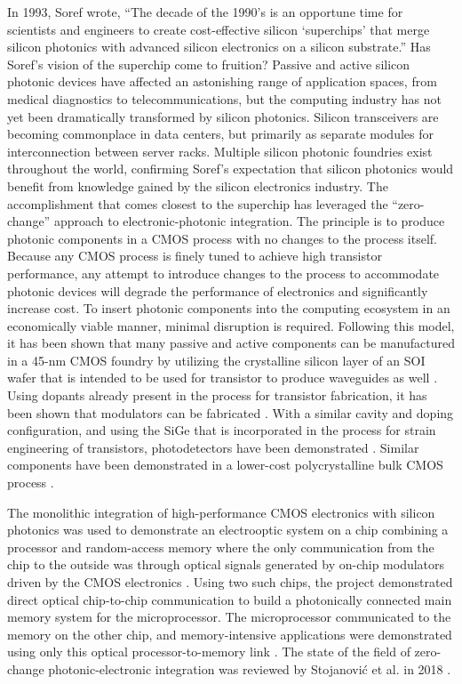In 1993, Soref wrote, ``The decade of the 1990's is an opportune time for scientists and engineers to create cost-effective silicon `superchips' that merge silicon photonics with advanced silicon electronics on a silicon substrate.'' Has Soref's vision of the superchip come to fruition? Passive and active silicon photonic devices have affected an astonishing range of application spaces, from medical diagnostics to telecommunications, but the computing industry has not yet been dramatically transformed by silicon photonics. Silicon transceivers are becoming commonplace in data centers, but primarily as separate modules for interconnection between server racks. Multiple silicon photonic foundries exist throughout the world, confirming Soref's expectation that silicon photonics would benefit from knowledge gained by the silicon electronics industry. The accomplishment that comes closest to the superchip has leveraged the ``zero-change'' approach to electronic-photonic integration. The principle is to produce photonic components in a CMOS process with no changes to the process itself. Because any CMOS process is finely tuned to achieve high transistor performance, any attempt to introduce changes to the process to accommodate photonic devices will degrade the performance of electronics and significantly increase cost. To insert photonic components into the computing ecosystem in an economically viable manner, minimal disruption is required. Following this model, it has been shown that many passive and active components can be manufactured in a 45-nm CMOS foundry by utilizing the crystalline silicon layer of an SOI wafer that is intended to be used for transistor to produce waveguides as well \cite{orma2012}. Using dopants already present in the process for transistor fabrication, it has been shown that modulators can be fabricated \cite{shor2013,alch2016}. With a similar cavity and doping configuration, and using the SiGe that is incorporated in the process for strain engineering of transistors, photodetectors have been demonstrated \cite{alra2016}. Similar components have been demonstrated in a lower-cost polycrystalline bulk CMOS process \cite{shor2013b,meor2014}. 

The monolithic integration of high-performance CMOS electronics with silicon photonics was used to demonstrate an electrooptic system on a chip combining a processor and random-access memory where the only communication from the chip to the outside was through optical signals generated by on-chip modulators driven by the CMOS electronics \cite{suwa2015}. Using two such chips, the project demonstrated direct optical chip-to-chip communication to build a photonically connected main memory system for the microprocessor. The microprocessor communicated to the memory on the other chip, and memory-intensive applications were demonstrated using only this optical processor-to-memory link \cite{suwa2015}. The state of the field of zero-change photonic-electronic integration was reviewed by Stojanovi\'{c} et al. in 2018 \cite{stra2018}.

